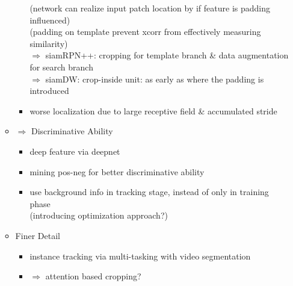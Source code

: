 \begin{itemize}
\begin{itemize}
\begin{itemize}
		(network can realize input patch location by if feature is padding influenced) \\
		(padding on template prevent xcorr from effectively measuring similarity) \\
		$\Rightarrow$ siamRPN++: cropping for template branch \& data augmentation for search branch \\
		$\Rightarrow$ siamDW: crop-inside unit: as early as where the padding is introduced \\
		\item worse localization due to large receptive field \& accumulated stride
		\end{itemize}
	\item $\Rightarrow$ Discriminative Ability
		\begin{itemize}
		\item deep feature via deepnet
		\item mining pos-neg for better discriminative ability
		\item use background info in tracking stage, instead of only in training phase \\
		(introducing optimization approach?)
		\end{itemize}
	\item Finer Detail
		\begin{itemize}
		\item instance tracking via multi-tasking with video segmentation
		\item $\Rightarrow$ attention based cropping?
		\end{itemize}
	\end{itemize}
\end{itemize}

